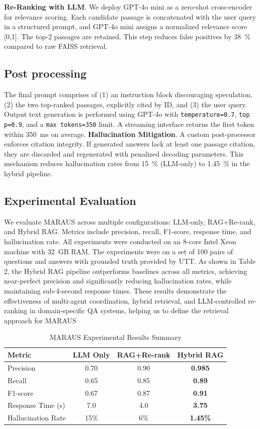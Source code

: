 \documentclass[runningheads]{llncs}
\begin{document}
\textbf{Re-Ranking with LLM}. We deploy GPT-4o mini as a zero-shot cross-encoder for relevance scoring. Each candidate passage is concatenated with the user query in a structured prompt, and GPT-4o mini assigns a normalized relevance score [0,1]. The top-2 passages are retained. This step reduces false positives by \SI{38}{\%} compared to raw FAISS retrieval.

\subsection{Post processing}
The final prompt comprises of (1) an instruction block discouraging speculation, (2) the two top-ranked passages, explicitly cited by ID, and (3) the user query. Output text generation is performed using GPT-4o with \texttt{temperature=0.7}, \texttt{top p=0.9}, and a \texttt{max tokens=350} limit. A streaming interface returns the first token within \SI{350}{ms} on average. \textbf{Hallucination Mitigation}. A custom post-processor enforces citation integrity. If generated answers lack at least one passage citation, they are discarded and regenerated with penalized decoding parameters. This mechanism reduces hallucination rates from \SI{15}{\%} (LLM-only) to \SI{1.45}{\%} in the hybrid pipeline.

\subsection{Experimental Evaluation}
We evaluate MARAUS across multiple configurations: LLM-only, RAG+Re-rank, and Hybrid RAG. Metrics include precision, recall, F1-score, response time, and hallucination rate. All experiments were conducted on an 8-core Intel Xeon machine with \SI{32}{GB} RAM. The experiments were on a set of 100 pairs of questions and answers with grounded truth provided by UTT. As shown in Table 2, the Hybrid RAG pipeline outperforms baselines across all metrics, achieving near-perfect precision and significantly reducing hallucination rates, while maintaining sub-4-second response times. These results demonstrate the effectiveness of multi-agent coordination, hybrid retrieval, and LLM-controlled re-ranking in domain-specific QA systems, helping us to define the retrieval approach for MARAUS

\begin{table}[ht]
\centering
\caption{MARAUS Experimental Results Summary}
\label{tab:exp-summary}
\begin{tabular}{|l|c|c|c|}
\hline
\textbf{Metric} & \textbf{LLM Only} & \textbf{RAG+Re-rank} & \textbf{Hybrid RAG} \\
\hline
Precision & 0.70 & 0.90 & \textbf{0.985} \\
Recall & 0.65 & 0.85 & \textbf{0.89} \\
F1-score & 0.67 & 0.87 & \textbf{0.91} \\
Response Time (s) & 7.0 & 4.0 & \textbf{3.75} \\
Hallucination Rate & 15\% & 6\% & \textbf{1.45\%} \\
\hline
\end{tabular}
\end{table}
\end{document}

